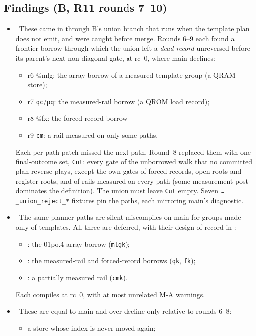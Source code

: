 \subsection*{Findings (B, R11 rounds 7--10)}
\begin{itemize}
\item \fconfirmed\ These came in through B's union branch that runs when the template plan does not emit, and were caught before merge. Rounds 6--9 each found a frontier borrow through which the union left a \emph{dead record} unreversed before its parent's next non-diagonal gate, at rc~0, where main declines:
  \begin{itemize}
  \item r6 @mlg: the array borrow of a measured template group (a QRAM store);
  \item r7 \texttt{qc}/\texttt{pq}: the measured-rail borrow (a QROM load record);
  \item r8 @fx: the forced-record borrow;
  \item r9 \texttt{cm}: a rail measured on only some paths.
  \end{itemize}
  Each per-path patch missed the next path. Round~8 replaced them with one final-outcome set, \texttt{Cut}: every gate of the unborrowed walk that no committed plan reverse-plays, except the own gates of forced records, open roots and register roots, and of rails measured on every path (some measurement post-dominates the definition). The union must leave \texttt{Cut} empty. Seven \texttt{\dots\_union\_reject\_*} fixtures pin the paths, each mirroring main's diagnostic.
\item \fpreexisting\ The same planner paths are silent miscompiles on main for groups made only of templates. All three are deferred, with their design of record in :
  \begin{itemize}
  \item {}: the 01po.4 array borrow (\texttt{mlgk});
  \item {}: the measured-rail and forced-record borrows (\texttt{qk}, \texttt{fk});
  \item {}: a partially measured rail (\texttt{cmk}).
  \end{itemize}
  Each compiles at rc~0, with at most unrelated M-A warnings.
\item \foverdecline\ These are equal to main and over-decline only relative to rounds 6--8:
  \begin{itemize}
  \item a store whose index is never moved again;

\end{itemize}
\end{itemize}
